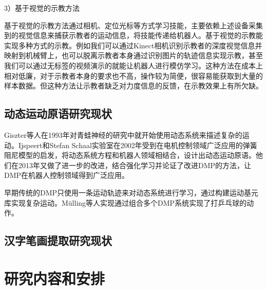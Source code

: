 3）基于视觉的示教方法

基于视觉的示教方法通过相机、定位光标等方式学习技能，主要依赖上述设备采集到的视觉信息来捕获示教者的运动信息，将技能传递给机器人。基于视觉的示教能实现多种方式的示教。例如我们可以通过Kinect相机识别示教者的深度视觉信息并映射到机械臂上\cite{Xu2018b}，也可以脱离示教者本身通过识别图片的轨迹信息实现示教\cite{Li2021}，甚至我们可以通过无标签的视频演示的就能让机器人进行模仿学习\cite{Sermanet2018}。这种方法在成本上相对低廉，对于示教者本身的要求也不高，操作较为简便，很容易能获取到大量的样本数据。但这种方法让示教者缺乏对力度信息的反馈，在示教效果上有所欠缺。

\subsection{动态运动原语研究现状}
Giszter等人在1993年对青蛙神经的研究中就开始使用动态系统来描述复杂的运动\cite{Giszter1993b}。Ijspeert和Stefan Schaal实验室在2002年受到在电机控制领域广泛应用的弹簧阻尼模型的启发，将动态系统方程和机器人领域相结合，设计出动态运动原语\cite{Ijspeert2002}。他们在2013年又做了进一步的改进，结合强化学习并论证了改进DMP的方法，让DMP在机器人控制领域得到广泛应用\cite{Ijspeert2013}。

早期传统的DMP只使用一条运动轨迹来对动态系统进行学习，通过构建运动基元库实现复杂运动。Mülling等人实现通过组合多个DMP系统实现了打乒乓球的动作\cite{Mulling2013}。





\subsection{汉字笔画提取研究现状}

\section{研究内容和安排}


